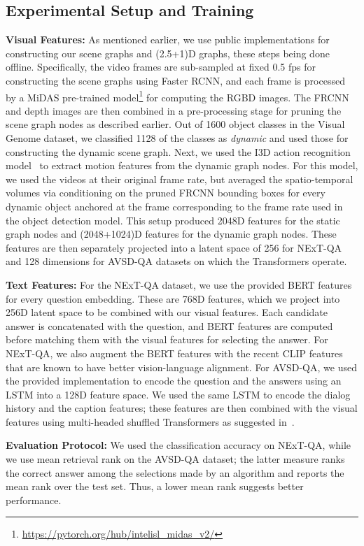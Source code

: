 \documentclass[letterpaper]{article} \usepackage{aaai22}  \usepackage{times}  \usepackage{helvet}  \usepackage{courier}  \usepackage[hyphens]{url}  \usepackage{graphicx} \urlstyle{rm} \def\UrlFont{\rm}  \usepackage{natbib}  \usepackage{caption} \DeclareCaptionStyle{ruled}{labelfont=normalfont,labelsep=colon,strut=off} \frenchspacing  \setlength{\pdfpagewidth}{8.5in}  \setlength{\pdfpageheight}{11in}  \usepackage{algorithm}
\newcommand{\name}{(2.5+1)D\xspace}
\begin{document}
\subsection{Experimental Setup and Training}
\noindent\textbf{Visual Features:} As mentioned earlier, we use public implementations for constructing our scene graphs and \name graphs, these steps being done offline. Specifically, the video frames are sub-sampled at fixed 0.5 fps for constructing the scene graphs using Faster RCNN, and each frame is processed by a MiDAS pre-trained model\footnote{\url{https://pytorch.org/hub/intelisl_midas_v2/}} for computing the RGBD images. The FRCNN and depth images are then combined in a pre-processing stage for pruning the scene graph nodes as described earlier. Out of 1600 object classes in the Visual Genome dataset, we classified 1128 of the classes as \emph{dynamic} and used those for constructing the dynamic scene graph. Next, we used the I3D action recognition model~\cite{carreira2017quo} to extract motion features from the dynamic graph nodes. For this model, we used the videos at their original frame rate, but averaged the spatio-temporal volumes via conditioning on the pruned FRCNN bounding boxes for every dynamic object anchored at the frame corresponding to the frame rate used in the object detection model. This setup produced 2048D features for the static graph nodes and (2048+1024)D features for the dynamic graph nodes. These features are then separately projected into a latent space of 256 for NExT-QA and 128 dimensions for AVSD-QA datasets on which the Transformers operate.

\noindent\textbf{Text Features:} For the NExT-QA dataset, we use the provided BERT features for every question embedding. These are 768D features, which we project into 256D latent space to be combined with our visual features. Each candidate answer is concatenated with the question, and BERT features are computed before matching them with the visual features for selecting the answer. For NExT-QA, we also augment the BERT features with the recent CLIP features~\cite{radford2021learning} that are known to have better vision-language alignment. For AVSD-QA, we used the provided implementation to encode the question and the answers using an LSTM into a 128D feature space. We used the same LSTM to encode the dialog history and the caption features; these features are then combined with the visual features using multi-headed shuffled Transformers as suggested in~\cite{geng2021dynamic}.

\noindent\textbf{Evaluation Protocol:} We used the classification accuracy on NExT-QA, while we use mean retrieval rank on the AVSD-QA dataset; the latter measure ranks the correct answer among the selections made by an algorithm and reports the mean rank over the test set. Thus, a lower mean rank suggests better performance.
\end{document}
